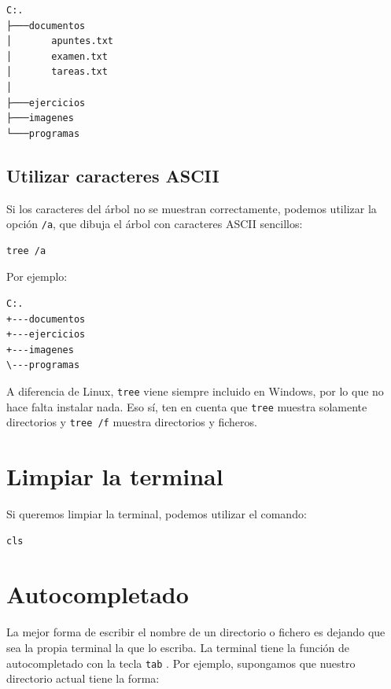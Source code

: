 \documentclass[11pt,a4paper]{article}
\begin{document}
\begin{lstlisting}
C:.
├───documentos
│       apuntes.txt
│       examen.txt
│       tareas.txt
│
├───ejercicios
├───imagenes
└───programas
\end{lstlisting}

\subsection{Utilizar caracteres ASCII}

Si los caracteres del árbol no se muestran correctamente, podemos
utilizar la opción \texttt{/a}, que dibuja el árbol con caracteres
ASCII sencillos:

\begin{lstlisting}
tree /a
\end{lstlisting}

\noindent Por ejemplo:

\begin{lstlisting}
C:.
+---documentos
+---ejercicios
+---imagenes
\---programas
\end{lstlisting}

\begin{importante}
A diferencia de Linux, \texttt{tree} viene siempre incluido en
Windows, por lo que no hace falta instalar nada. Eso sí, ten en
cuenta que \texttt{tree} muestra solamente directorios y
\texttt{tree /f} muestra directorios y ficheros.
\end{importante}




\section{Limpiar la terminal}

Si queremos limpiar la terminal, podemos utilizar el comando:

\begin{lstlisting}
cls
\end{lstlisting}




\section{Autocompletado}

La mejor forma de escribir el nombre de un directorio o fichero es dejando que sea la propia terminal la que lo escriba. La terminal tiene la función de autocompletado con la tecla \texttt{tab} \keys{\tab}. Por ejemplo, supongamos que nuestro directorio actual tiene la forma:
\end{document}

